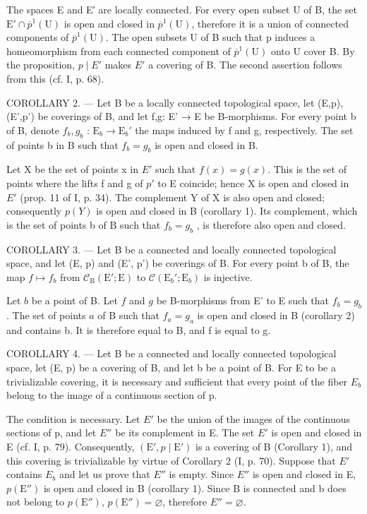 The spaces E and E′ are locally connected. For every open subset U of B, the set \(\mathrm{E}'\cap\overline{p}^{1}(\mathrm{U})\) is open and closed in \(\overline{p}^{1}(\mathrm{U})\), therefore it is a union of connected components of \(\overline{p}^{1}(\mathrm{U})\). The open subsets U of B such that p induces a homeomorphism from each connected component of \(\overline{p}^{1}(\mathrm{U})\) onto U cover B. By the proposition, \(p\mid E'\) makes \(E'\) a covering of B. The second assertion follows from this (cf. I, p. 68).

COROLLARY 2. --- Let B be a locally connected topological space, let (E,p), (E',p') be coverings of B, and let f,g: E' → E be B-morphisms. For every point b of B, denote \(f_b,g_b\) : \(\mathrm{E}_b\to \mathrm{E}_b'\) the maps induced by f and g, respectively. The set of points b in B such that \(f_b = g_b\) is open and closed in B.

Let X be the set of points x in \(E'\) such that \(f(x) = g(x)\). This is the set of points where the lifts f and g of \(p'\) to E coincide; hence X is open and closed in \(E'\) (prop. 11 of I, p. 34). The complement Y of X is also open and closed; consequently \(p(Y)\) is open and closed in B (corollary 1). Its complement, which is the set of points b of B such that \(f_{b} = g_{b}\) , is therefore also open and closed.

COROLLARY 3. --- Let B be a connected and locally connected topological space, and let (E, p) and (E', p') be coverings of B. For every point b of B, the map \(f \mapsto f_b\) from \(\mathcal{C}_{\mathrm{B}}(\mathrm{E}'; \mathrm{E})\) to \(\mathcal{C}(\mathrm{E}_b'; \mathrm{E}_b)\) is injective.

Let \(b\) be a point of B. Let \(f\) and \(g\) be B-morphisms from E' to E such that \(f_b = g_b\). The set of points \(a\) of B such that \(f_a = g_a\) is open and closed in B (corollary 2) and contains b. It is therefore equal to B, and f is equal to g.

COROLLARY 4. --- Let B be a connected and locally connected topological space, let (E, p) be a covering of B, and let b be a point of B. For E to be a trivializable covering, it is necessary and sufficient that every point of the fiber \(E_{b}\) belong to the image of a continuous section of p.

The condition is necessary. Let \(E'\) be the union of the images of the continuous sections of p, and let \(E''\) be its complement in E. The set \(E'\) is open and closed in E (cf. I, p. 79). Consequently, \((\mathrm{E}', p \mid \mathrm{E}')\) is a covering of B (Corollary 1), and this covering is trivializable by virtue of Corollary 2 (I, p. 70). Suppose that \(E'\) contains \(E_b\) and let us prove that \(E''\) is empty. Since \(E''\) is open and closed in E, \(p(\mathrm{E}'')\) is open and closed in B (corollary 1). Since B is connected and b does not belong to \(p(\mathrm{E}'')\), \(p(\mathrm{E}'') = \varnothing\), therefore \(E'' = \varnothing\).

